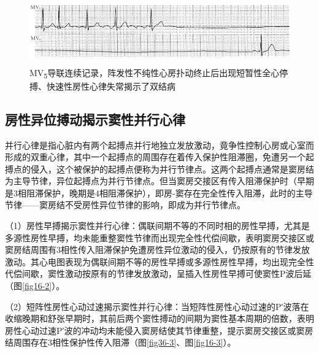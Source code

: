 \begin{figure}[!htbp]
 \centering
 \includegraphics[width=5.69792in,height=1.125in]{./images/Image00574.jpg}
 \captionsetup{justification=centering}
 \caption{MV\textsubscript{5}导联连续记录，阵发性不纯性心房扑动终止后出现短暂性全心停搏、快速性房性心律失常揭示了双结病}
 \label{fig36-2}
  \end{figure} 


\protect\hypertarget{text00043.htmlux5cux23subid467}{}{}

\subsection{房性异位搏动揭示窦性并行心律}

并行心律是指心脏内有两个起搏点并行地独立发放激动，竟争性控制心房或心室而形成的双重心律，其中一个起搏点的周围存在着传入保护性阻滞圈，免遭另一个起搏点的侵入，这个被保护的起搏点便称为并行节律点。这两个起搏点通常是窦房结为主导节律，异位起搏点为并行节律点。但当窦房交接区有传入阻滞保护时（早期是3相阻滞保护，晚期是4相阻滞保护），即房-窦存在完全性传入阻滞，此时的主导节律------窦房结不受房性异位节律的影响，即成为并行节律点。

（1）房性早搏揭示窦性并行心律：偶联间期不等的不同时相的房性早搏，尤其是多源性房性早搏，均未能重整窦性节律而出现完全性代偿间歇，表明窦房交接区或窦房结周围有3相性传入阻滞保护免遭房性异位激动的侵入，仍按原有的节律发放激动。其心电图表现为偶联间期不等的房性早搏或多源性房性早搏，均出现完全性代偿间歇，窦性激动按原有的节律发放激动，呈插入性房性早搏可使窦性P波后延（图\ref{fig16-2}）。

（2）短阵性房性心动过速揭示窦性并行心律：当短阵性房性心动过速的P′波落在收缩晚期和舒张早期时，其前后两个窦性搏动的间期为窦性基本周期的倍数，表明房性心动过速P′波的冲动均未能侵入窦房结使其节律重整，提示窦房交接区或窦房结周围存在3相性保护性传入阻滞（图\ref{fig36-3}、图\ref{fig16-3}）。

